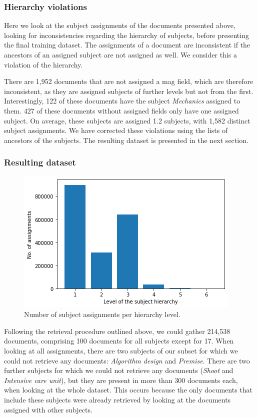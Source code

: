 \subsubsection{Hierarchy violations} \label{supervised_approach_data_hierarchy}

Here we look at the subject assignments of the documents presented above, looking for inconsistencies regarding the hierarchy of subjects, before presenting the final training dataset. The assignments of a document are inconsistent if the ancestors of an assigned subject are not assigned as well. We consider this a violation of the hierarchy.

There are 1,952 documents that are not assigned a \acrshort{mag} field, which are therefore inconsistent, as they are assigned subjects of further levels but not from the first. Interestingly, 122 of these documents have the subject \textit{Mechanics} assigned to them. 427 of these documents without assigned fields only have one assigned subject. On average, these subjects are assigned 1.2 subjects, with 1,582 distinct subject assignments. We have corrected these violations using the lists of ancestors of the subjects. The resulting dataset is presented in the next section.

\subsubsection{Resulting dataset} \label{supervised_approach_data_result}

\begin{figure}
    \centering
    \includegraphics[width=.7\textwidth]{figures/supervised_approach/training_data_levels.png}
    \caption{Number of subject assignments per hierarchy level.}
    \label{fig:training_data_levels}
\end{figure}

Following the retrieval procedure outlined above, we could gather 214,538 documents, comprising 100 documents for all subjects except for 17. When looking at all assignments, there are two subjects of our subset for which we could not retrieve any documents: \textit{Algorithm design} and \textit{Premise}. There are two further subjects for which we could not retrieve any documents (\textit{Shoot} and \textit{Intensive care unit}), but they are present in more than 300 documents each, when looking at the whole dataset. This occurs because the only documents that include these subjects were already retrieved by looking at the documents assigned with other subjects.

